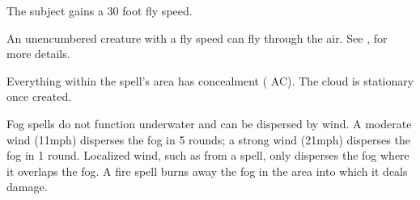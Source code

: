 \spellrng{\rngtouch}
\spelldur{\durshort}
\begin{spelleffect}
    The subject gains a 30 foot fly speed.
\end{spelleffect}
\begin{spellnotes}
    An unencumbered creature with a fly speed can fly through the air. See , for more details.
\end{spellnotes}

\spellrng{\rngmed}
\spelldur{\durshort}
\begin{spelleffect}
  Everything within the spell's area has concealment ( AC). The cloud is stationary once created.
\end{spelleffect}
\begin{spellnotes}
    Fog spells do not function underwater and can be dispersed by wind. A moderate wind (11\add mph) disperses the fog in 5 rounds; a strong wind (21\add mph) disperses the fog in 1 round. Localized wind, such as from a  spell, only disperses the fog where it overlaps the fog. A fire spell burns away the fog in the area into which it deals damage.
\end{spellnotes}

